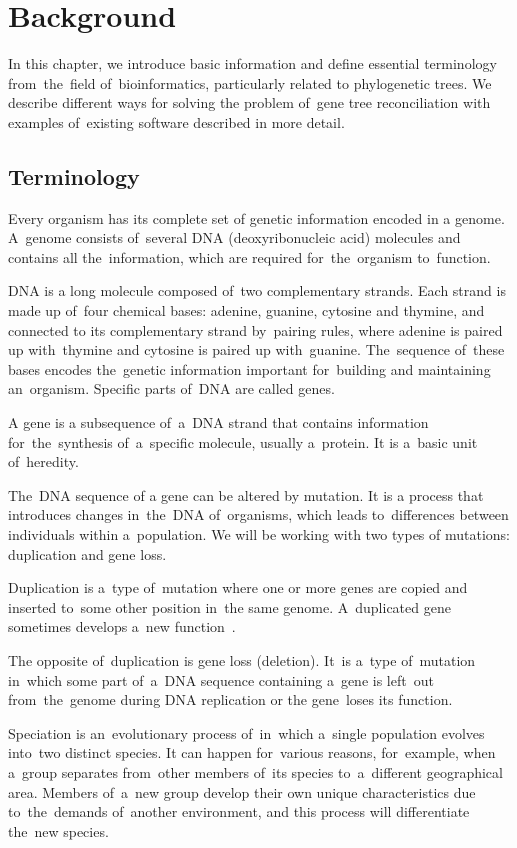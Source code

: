 \chapter{Background}
In this chapter, we introduce basic information and define essential terminology from~the~field of~bioinformatics, particularly related to phylogenetic trees. We describe different ways for solving the problem of~gene tree reconciliation with examples of~existing software described in more detail.

\section{Terminology}
Every organism has its complete set of genetic information encoded in a genome. A~genome consists of~several DNA (deoxyribonucleic acid) molecules and contains all the~information, which are required for~the~organism to~function.

DNA is a long molecule composed of~two complementary strands. Each strand is made up of~four chemical bases: adenine, guanine, cytosine and thymine, and connected to its complementary strand by~pairing rules, where adenine is paired up with~thymine and cytosine is paired up with~guanine. The~sequence of~these bases encodes the~genetic information important for~building and maintaining an~organism. Specific parts of~DNA are called genes.

A gene is a subsequence of~a~DNA strand that contains information for~the~synthesis of~a~specific molecule, usually a~protein. It is a~basic unit of~heredity.

The~DNA sequence of a gene can be altered by mutation. It is a process that introduces changes in~the~DNA of~organisms, which leads to~differences between individuals within a~population. We will be working with two types of mutations: duplication and gene loss.

Duplication is a~type of~mutation where one or more genes are copied and inserted to~some other position in~the same genome. A~duplicated gene sometimes develops a~new function~\cite{doyon}.

The opposite of~duplication is gene loss (deletion). It~is a~type of~mutation in~which some part of~a~DNA sequence containing a~gene is left~out from~the~genome during DNA replication or the gene~loses its function. 

Speciation is an~evolutionary process of~in~which a~single population evolves into~two distinct species. It can happen for~various reasons, for~example, when a~group separates from~other members of~its species to~a~different geographical area. Members of~a~new group develop their own unique characteristics due to~the~demands of~another environment, and this process will differentiate the~new species.

